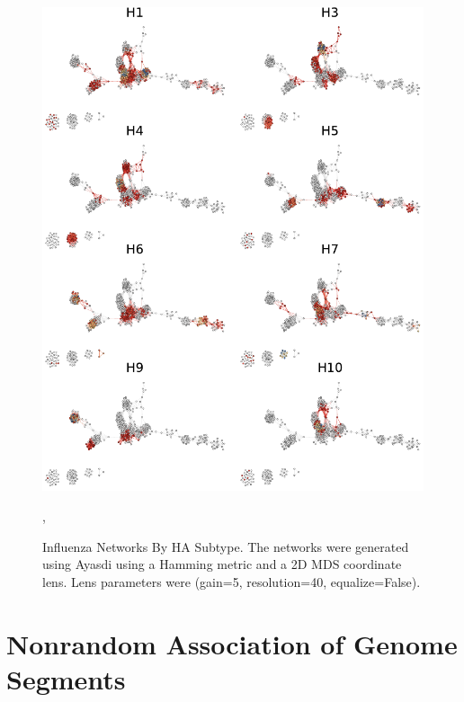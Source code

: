 
\begin{figure}
\centering
\includegraphics[width=\textwidth]{fig/influenza/flu_networks_by_subtype.pdf}
\caption[Influenza Networks By HA Subtype]{Influenza Networks By HA Subtype. The networks were generated using Ayasdi using a Hamming metric and a 2D MDS coordinate lens. Lens parameters were (gain=5, resolution=40, equalize=False).},
\label{fig:flu:networks_by_subtype}
\end{figure}

\section{Nonrandom Association of Genome Segments}
\label{flu:nonrandom_reassortment}

